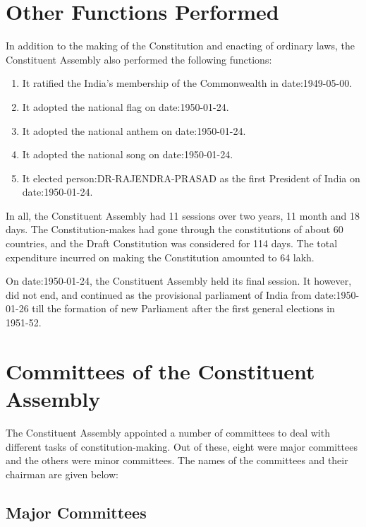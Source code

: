 \begin{multicol}{2}
\section{Other Functions Performed}

In addition to the making of the Constitution and enacting of ordinary laws, the Constituent Assembly also performed the following functions:

\begin{enumerate}
  \item It ratified the India's membership of the Commonwealth in \gls{date:1949-05-00}.
  \item It adopted the national flag on \gls{date:1950-01-24}.
  \item It adopted the national anthem on \gls{date:1950-01-24}.
  \item It adopted the national song on \gls{date:1950-01-24}.
  \item It elected \gls{person:DR-RAJENDRA-PRASAD} as the first President of India on \gls{date:1950-01-24}.
\end{enumerate}

In all, the Constituent Assembly had 11 sessions over two years, 11 month and 18 days. The Constitution-makes had gone through the constitutions of about 60 countries, and the Draft Constitution was considered for 114 days. The total expenditure incurred on making the Constitution amounted to 64 lakh.

On \gls{date:1950-01-24}, the Constituent Assembly held its final session. It however, did not end, and continued as the provisional parliament of India from \gls{date:1950-01-26} till the formation of new Parliament after the first general elections in 1951-52.

\section{Committees of the Constituent Assembly}

The Constituent Assembly appointed a number of committees to deal with different tasks of constitution-making. Out of these, eight were major committees and the others were minor committees. The names of the committees and their chairman are given below:

\subsection{Major Committees}


\end{multicol}
